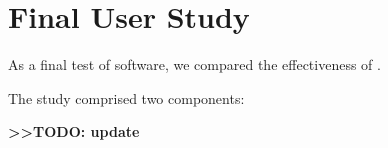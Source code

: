 \section{Final User Study}\label{final-user-study}

As a final test of software, we compared the effectiveness of .

The study comprised two components:

\textbf{\textgreater{}\textgreater{}TODO: update}

